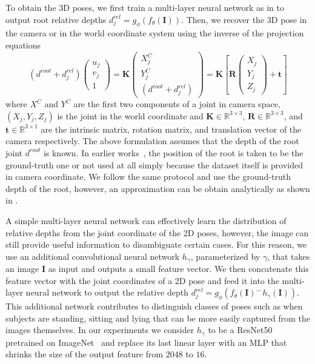 \documentclass[runningheads]{llncs}
\def\Vec#1{{\boldsymbol{#1}}}
\def\Mat#1{{\boldsymbol{#1}}}
\newcommand{\bI}{\boldsymbol{I}}
\begin{document}
To obtain the 3D poses, we first train a multi-layer neural network as in \cite{Martinez17a} to output root relative depths $d^{rel}_j = g_{\phi}(f_{\theta}(\Mat{I}))$. Then, we recover the 3D pose in the camera or in the world coordinate system using the inverse of the projection equations
\begin{equation}
(d^{root}+d^{rel}_j)\begin{pmatrix}
           u_j \\
           v_j \\
			1
         \end{pmatrix} 
= \Mat{K} 
         \begin{pmatrix}
           X^C_j \\
           Y^C_j \\
			(d^{root}+d^{rel}_j)
         \end{pmatrix}
= \Mat{K} \left[ \Mat{R}
         \begin{pmatrix}
           X_j \\
           Y_j \\
		   Z_j
         \end{pmatrix}    
         + \Vec{t}      
          \right]
\end{equation}
where $X^C$ and $Y^C$ are the first two components of a joint in camera space, $(X_j,Y_j,Z_j)$ is the joint in the world coordinate and $\Mat{K} \in \mathbb{R}^{3 \times 3}$, $\Mat{R} \in \mathbb{R}^{3 \times 3}$, and $\Vec{t} \in \mathbb{R}^{3 \times 1}$ are the intrinsic matrix, rotation matrix, and translation vector of the camera respectively.
The above formulation assumes that the depth of the root joint $d^{root}$ is known. In earlier works~\cite{Rhodin18a, Martinez17a, Sun18d}, the position of the root is taken to be the ground-truth one or not used at all simply because the dataset itself is provided in camera coordinate. We follow the same protocol and use the ground-truth depth of the root, however, an approximation can be obtain analytically as shown in \cite{Iqbal18}.

A simple multi-layer neural network can effectively learn the distribution of relative depths from the joint coordinate of the 2D poses, however, the image can still provide useful information to disambiguate certain cases. For this reason, we use an additional convolutional neural network $h_{\gamma}$, parameterized by $\gamma$, that takes an image $\bI$ as input and outputs a small feature vector. We then concatenate this feature vector with the joint coordinates of a 2D pose and feed it into the multi-layer neural network to output the relative depth $d^{rel}_j = g_{\phi}(f_{\theta}(\Mat{I})^\frown h_{\gamma}(\Mat{I}))$. This additional network contributes to distinguish classes of poses such as when subjects are standing, sitting and lying that can be more easily captured from the images themselves. In our experiments we consider $h_{\gamma}$ to be a ResNet50~\cite{He16a} pretrained on ImageNet~\cite{Russakovsky15} and replace its last linear layer with an MLP that shrinks the size of the output feature from $2048$ to $16$.
\end{document}

